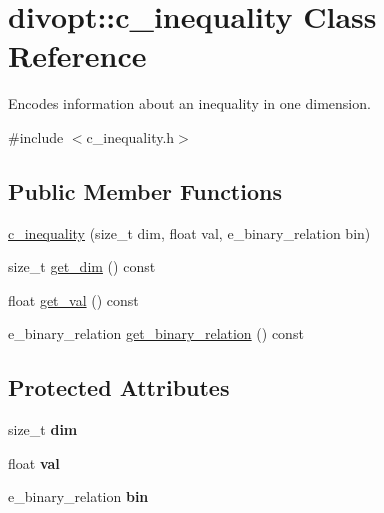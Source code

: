 \hypertarget{classdivopt_1_1c__inequality}{\section{divopt\-:\-:c\-\_\-inequality \-Class \-Reference}
\label{classdivopt_1_1c__inequality}
}


\-Encodes information about an inequality in one dimension.  




{\ttfamily \#include $<$c\-\_\-inequality.\-h$>$}

\subsection*{\-Public \-Member \-Functions}
\begin{DoxyCompactItemize}
\item 
\hyperlink{classdivopt_1_1c__inequality_a3d4de45d504aaf879da1f7d7ae25f861}{c\-\_\-inequality} (size\-\_\-t dim, float val, e\-\_\-binary\-\_\-relation bin)
\item 
size\-\_\-t \hyperlink{classdivopt_1_1c__inequality_afb5dd6c446121411ed6c448d626fc140}{get\-\_\-dim} () const 
\item 
float \hyperlink{classdivopt_1_1c__inequality_a1a8d25293c061d3c401dd0b80182831a}{get\-\_\-val} () const 
\item 
e\-\_\-binary\-\_\-relation \hyperlink{classdivopt_1_1c__inequality_a5ee170b0008faf856d8977ac367a1322}{get\-\_\-binary\-\_\-relation} () const 
\end{DoxyCompactItemize}
\subsection*{\-Protected \-Attributes}
\begin{DoxyCompactItemize}
\item 
\hypertarget{classdivopt_1_1c__inequality_ab06f2c5d46b1b2ba8e4563c3bac9717b}{size\-\_\-t {\bfseries dim}}\label{classdivopt_1_1c__inequality_ab06f2c5d46b1b2ba8e4563c3bac9717b}

\item 
\hypertarget{classdivopt_1_1c__inequality_ab5674ef217950aca841be30c1fff85aa}{float {\bfseries val}}\label{classdivopt_1_1c__inequality_ab5674ef217950aca841be30c1fff85aa}

\item 
\hypertarget{classdivopt_1_1c__inequality_a15fbcc215a10dd50da5544c27286a5aa}{e\-\_\-binary\-\_\-relation {\bfseries bin}}\label{classdivopt_1_1c__inequality_a15fbcc215a10dd50da5544c27286a5aa}

\end{DoxyCompactItemize}


